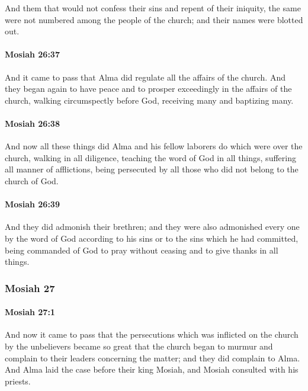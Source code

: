 			And them that would not confess their sins and repent of their iniquity,
			the same were not numbered among the people of the church;
			and their names were blotted out.

		\paragraph{Mosiah 26:37} %
			\label{MOSIAH-26-37}

			And it came to pass that Alma did regulate all the affairs of the church.
			And they began again to have peace
			and to prosper exceedingly in the affairs of the church,
			walking circumspectly before God,
			receiving many and baptizing many.

		\paragraph{Mosiah 26:38} %
			\label{MOSIAH-26-38}

			And now all these things did Alma and his fellow laborers do
			which were over the church,
			walking in all diligence,
			teaching the word of God in all things,
			suffering all manner of afflictions,
			being persecuted by all those who did not belong to the church of God.

		\paragraph{Mosiah 26:39} %
			\label{MOSIAH-26-39}

			And they did admonish their brethren;
			and they were also admonished every one by the word of God
			according to his sins or to the sins which he had committed,
			being commanded of God to pray without ceasing
			and to give thanks in all things.

	\subsubsection{Mosiah 27} %
		\label{MOSIAH-27}
		
		\paragraph{Mosiah 27:1} %
			\label{MOSIAH-27-1}

			And now it came to pass that
			the persecutions which was inflicted on the church by the unbelievers became so great
			that the church began to murmur
			and complain to their leaders concerning the matter;
			and they did complain to Alma.
			And Alma laid the case before their king Mosiah,
			and Mosiah consulted with his priests.

